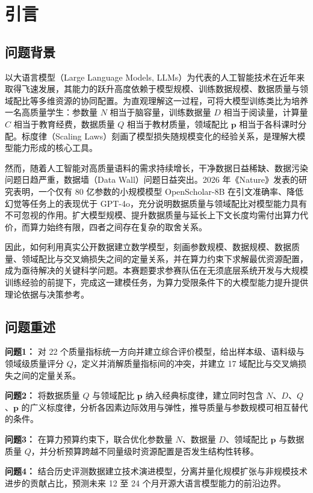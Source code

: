 \section{引言}
\subsection{问题背景}

以大语言模型（Large Language Models, LLMs）为代表的人工智能技术在近年来取得飞速发展，其能力的跃升高度依赖于模型规模、训练数据规模、数据质量与领域配比等多维资源的协同配置。为直观理解这一过程，可将大模型训练类比为培养一名高质量学生：参数量 $N$ 相当于脑容量，训练数据量 $D$ 相当于阅读量，计算量 $C$ 相当于教育经费，数据质量 $Q$ 相当于教材质量，领域配比 $\bm{p}$ 相当于各科课时分配。标度律（Scaling Laws）刻画了模型损失随规模变化的经验关系，是理解大模型能力形成的核心工具\cite{kaplan2020scaling,hoffmann2022chinchilla}。

然而，随着人工智能对高质量语料的需求持续增长，干净数据日益稀缺、数据污染问题日趋严重，数据墙（Data Wall）问题日益突出\cite{villalobos2022data}。2026 年《Nature》发表的研究表明，一个仅有 80 亿参数的小规模模型 OpenScholar-8B 在引文准确率、降低幻觉等任务上的表现优于 GPT-4o\cite{asai2026openscholar,brown2020gpt3}，充分说明数据质量与领域配比对模型能力具有不可忽视的作用。扩大模型规模、提升数据质量与延长上下文长度均需付出算力代价，而算力始终有限，四者之间存在复杂的取舍关系。

因此，如何利用真实公开数据建立数学模型，刻画参数规模、数据规模、数据质量、领域配比与交叉熵损失之间的定量关系，并在算力约束下求解最优资源配置，成为亟待解决的关键科学问题。本赛题要求参赛队伍在无须底层系统开发与大规模训练经验的前提下，完成这一建模任务，为算力受限条件下的大模型能力提升提供理论依据与决策参考。

\subsection{问题重述}

\textbf{问题1：} 对 22 个质量指标统一方向并建立综合评价模型，给出样本级、语料级与领域级质量评分 $Q$，定义并消解质量指标间的冲突，并建立 17 域配比与交叉熵损失之间的定量关系。

\textbf{问题2：} 将数据质量 $Q$ 与领域配比 $\bm{p}$ 纳入经典标度律，建立同时包含 $N$、$D$、$Q$、$\bm{p}$ 的广义标度律，分析各因素边际效用与弹性，推导质量与参数规模可相互替代的条件。

\textbf{问题3：} 在算力预算约束下，联合优化参数量 $N$、数据量 $D$、领域配比 $\bm{p}$ 与数据质量 $Q$，并分析预算跨越不同量级时资源配置是否发生结构性转移。

\textbf{问题4：} 结合历史评测数据建立技术演进模型，分离并量化规模扩张与非规模技术进步的贡献占比，预测未来 12 至 24 个月开源大语言模型能力的前沿边界。
